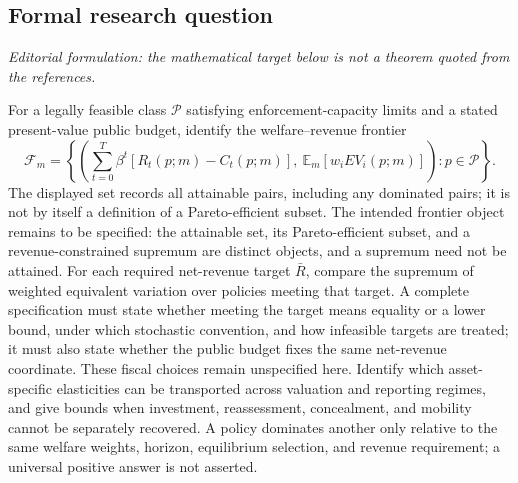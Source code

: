 \documentclass[11pt,a4paper]{article}
\begin{document}
\subsection*{Formal research question}
\emph{Editorial formulation: the mathematical target below is not a theorem quoted from the references.}

For a legally feasible class $\mathcal P$ satisfying enforcement-capacity limits and a stated present-value public budget, identify the welfare--revenue frontier
\[
 \mathcal F_m=\left\{\left(\sum_{t=0}^{T}\beta^t[R_t(p;m)-C_t(p;m)],\ \mathbb E_m[w_iEV_i(p;m)]\right):p\in\mathcal P\right\}.
\]
The displayed set records all attainable pairs, including any dominated pairs; it is not by itself a definition of a Pareto-efficient subset. The intended frontier object remains to be specified: the attainable set, its Pareto-efficient subset, and a revenue-constrained supremum are distinct objects, and a supremum need not be attained. For each required net-revenue target $\bar R$, compare the supremum of weighted equivalent variation over policies meeting that target. A complete specification must state whether meeting the target means equality or a lower bound, under which stochastic convention, and how infeasible targets are treated; it must also state whether the public budget fixes the same net-revenue coordinate. These fiscal choices remain unspecified here. Identify which asset-specific elasticities can be transported across valuation and reporting regimes, and give bounds when investment, reassessment, concealment, and mobility cannot be separately recovered. A policy dominates another only relative to the same welfare weights, horizon, equilibrium selection, and revenue requirement; a universal positive answer is not asserted.
\end{document}
